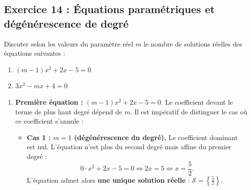 \documentclass[11pt,a4paper]{article}
\begin{document}
\subsection*{Exercice 14 : Équations paramétriques et dégénérescence de degré}
Discuter selon les valeurs du paramètre réel $m$ le nombre de solutions réelles des équations suivantes :
\begin{enumerate}
    \item $(m-1)x^2 + 2x - 5 = 0$
    \item $3x^2 - mx + 4 = 0$
\end{enumerate}

\begin{correctionbox}
\begin{enumerate}
    \item \textbf{Première équation :} $(m-1)x^2 + 2x - 5 = 0$.
    Le coefficient devant le terme de plus haut degré dépend de $m$. Il est impératif de distinguer le cas où ce coefficient s'annule :
    \begin{itemize}
        \item \textbf{Cas 1 : $m = 1$ (dégénérescence du degré).}
        Le coefficient dominant est nul. L'équation n'est plus du second degré mais affine du premier degré :
        \[
        0 \cdot x^2 + 2x - 5 = 0 \iff 2x = 5 \iff x = \frac{5}{2}.
        \]
        L'équation admet alors \textbf{une unique solution réelle} : $\mathcal{S} = \left\{\frac{5}{2}\right\}$.


\end{itemize}
\end{enumerate}
\end{correctionbox}
\end{document}
